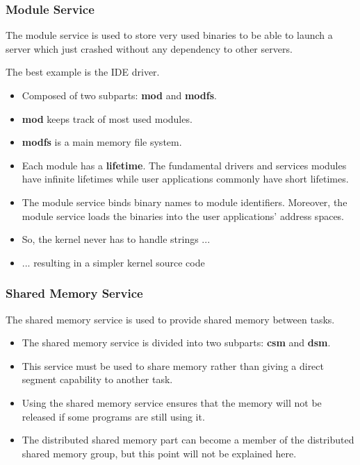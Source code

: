 {%

\begin{frame}
  \frametitle{Module Service}

  The module service is used to store very used binaries to be able to
  launch a server which just crashed without any dependency to other servers.

  \nl

  The best example is the IDE driver.

  \nl

  \begin{itemize}[<+->]
    \item
      Composed of two subparts: \textbf{mod} and \textbf{modfs}.
    \item
      \textbf{mod} keeps track of most used modules.
    \item
      \textbf{modfs} is a main memory file system.
    \item
      Each module has a \textbf{lifetime}. The fundamental drivers
      and services modules have infinite lifetimes while user applications
      commonly have short lifetimes.
    \item
      The module service binds binary names to module identifiers.
      Moreover, the module service loads the binaries into the
      user applications' address spaces.
    \item
      So, the kernel never has to handle strings ...
    \item
      ... resulting in a simpler kernel source code
  \end{itemize}
\end{frame}


\begin{frame}
  \frametitle{Shared Memory Service}

  The shared memory service is used to provide shared memory between tasks.

  \nl

  \begin{itemize}[<+->]
    \item
      The shared memory service is divided into two subparts:
      \textbf{csm} and \textbf{dsm}.
    \item
      This service must be used to share memory rather than giving a
      direct segment capability to another task.
    \item
      Using the shared memory service ensures that the memory will not
      be released if some programs are still using it.
    \item
      The distributed shared memory part can become a member of the
      distributed shared memory group, but this point will not be
      explained here.
  \end{itemize}
\end{frame}

}

